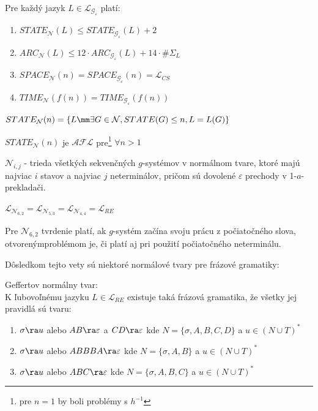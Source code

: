 \begin{dosledok}
Pre každý jazyk $L\in\mathcal{L}_{\mathcal{G}_{\varepsilon}}$
platí:
\begin{enumerate}
  \item $STATE_{\mathcal{N}}(L)\leq STATE_{\mathcal{G}_{\mathcal{\varepsilon}}}(L)+2$
  \item $ARC_{\mathcal{N}}(L)\leq 12\cdot ARC_{\mathcal{G}_{\varepsilon}}(L)+14\cdot \#\Sigma_L$
  \item $SPACE_{\mathcal{N}}(n)=SPACE_{\mathcal{G}_{\varepsilon}}(n)=\mathcal{L}_{CS}$
  \item $TIME_{\mathcal{N}}(f(n))=TIME_{\mathcal{G}_{\varepsilon}}(f(n))$
\end{enumerate}
\end{dosledok}

\begin{oznacenie}
$STATE_{\mathcal{N}}(n)=\{ L\mm\exists G\in\mathcal{N}, STATE(G)\leq n, L=L(G)\}$
\end{oznacenie}

\begin{veta}
$STATE_{\mathcal{N}}(n)$ je $\mathcal{AFL}$ pre\footnote{pre $n=1$ by boli problémy s
$h^{-1}$} $\forall n>1$
\end{veta}

\begin{oznacenie}
$\mathcal{N}_{i,j}$ - trieda všetkých sekvenčných $g$-systémov v
normálnom tvare, ktoré majú najviac $i$ stavov a najviac $j$
neterminálov, pričom sú dovolené $\varepsilon$ prechody v
1-$a$-prekladači.
\end{oznacenie}

\pagebreak

\begin{veta}
$\mathcal{L}_{\mathcal{N}_{6,2}}=\mathcal{L}_{\mathcal{N}_{5,3}}=\mathcal{L}_{\mathcal{N}_{4,4}}=\mathcal{L}_{RE}$
\end{veta}

Pre $\mathcal{N}_{6,2}$ tvrdenie platí, ak $g$-systém začína svoju
prácu z počiatočného slova, otvoreným\linebreak problémom je, či
platí aj pri použití počiatočného neterminálu.

\medskip
Dôsledkom tejto vety sú niektoré normálové tvary pre frázové
gramatiky:

\begin{dosledok}
Geffertov normálny tvar:\\
K ľubovoľnému jazyku $L\in\mathcal{L}_{RE}$ existuje taká frázová
gramatika, že všetky jej pravidlá sú tvaru:
\begin{enumerate}
  \item $\sigma\ra u$ alebo $AB\ra\varepsilon$ a $CD\ra\varepsilon$ kde $N=\{\sigma
  ,A,B,C,D\}$ a $u\in (N\cup T)^*$
  \item $\sigma\ra u$ alebo $ABBBA\ra\varepsilon$ kde $N=\{\sigma ,A,B\}$ a $u\in (N\cup T)^*$
  \item $\sigma\ra u$ alebo $ABC\ra\varepsilon$ kde $N=\{\sigma ,A,B,C\}$ a $u\in (N\cup T)^*$
\end{enumerate}
\end{dosledok}

